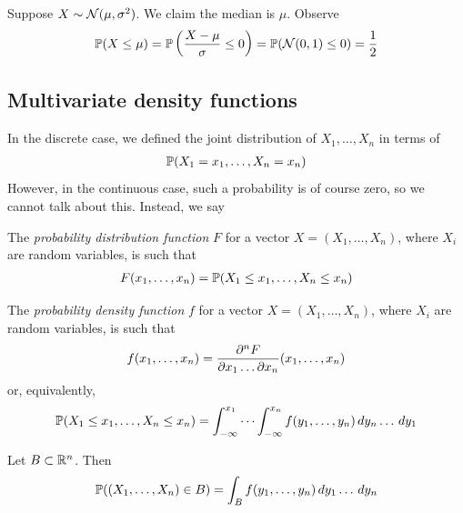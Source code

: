 \documentclass{../template/note}
\begin{document}
    \begin{example*}
        Suppose \(X \sim \mathcal{N}(\mu, \sigma^2)\). We claim the median is \(\mu\). Observe
        \begin{align*}
            \mathbb P(X \leq \mu) = \mathbb P\left(\frac{X-\mu}{\sigma} \leq 0\right) = \mathbb P(\mathcal{N}(0, 1) \leq 0) = \frac 1 2
        \end{align*}
    \end{example*}
    
    \subsection{Multivariate density functions}

    In the discrete case, we defined the joint distribution of \(X_1, \dots, X_n\) in terms of
    \begin{align*}
        \mathbb P(X_1 = x_1, \dots, X_n = x_n)
    \end{align*}
    However, in the continuous case, such a probability is of course zero, so we cannot talk about this. Instead, we say

    \begin{definition}
        The \emph{probability distribution function} \(F\) for a vector \(X = (X_1, \dots, X_n)\), where \(X_i\) are random variables, is such that
        \begin{align*}
            F(x_1, \dots, x_n) = \mathbb P(X_1 \leq x_1, \dots, X_n \leq x_n)
        \end{align*}
    \end{definition}
    
    \begin{definition}
        The \emph{probability density function} \(f\) for a vector \(X = (X_1, \dots, X_n)\), where \(X_i\) are random variables, is such that
        \begin{align*}
            f(x_1, \dots, x_n) = \pd{^nF}{x_1\dots \pr x_n}(x_1, \dots, x_n)
        \end{align*}
        or, equivalently,
        \begin{align*}
            \mathbb P(X_1 \leq x_1, \dots, X_n \leq x_n) = \int_{-\infty}^{x_1} \cdots \int_{-\infty}^{x_n} f(y_1, \dots, y_n) \,d{y}_n \dots \,d{y}_1
        \end{align*}        
    \end{definition}
    
    \begin{proposition}
        Let \(B \subset \mathbb R^n\). Then
        \begin{align*}
            \mathbb P((X_1, \dots, X_n) \in B) = \int_B f(y_1, \dots, y_n) \,d{y}_1 \dots \,d{y}_n
        \end{align*}
    \end{proposition}
    
\end{document}
